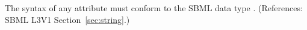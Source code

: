 The syntax of any  attribute must conform to the SBML data type
.  (References: SBML
L3V1 Section~\ref{sec:string}.)
